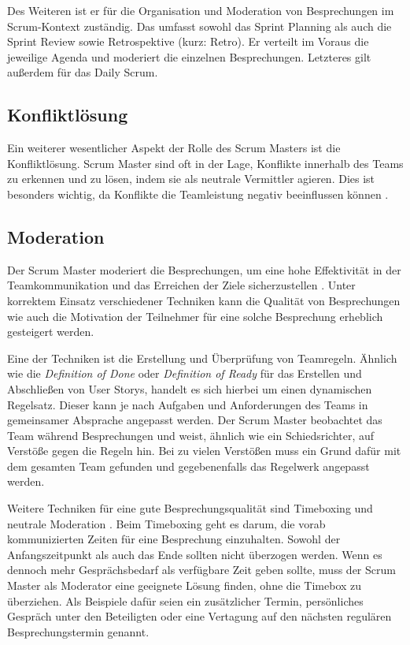 \documentclass[5pt, final]{beamer}
\begin{document}
\begin{frame}[t]
\begin{multicols}{3}
			Des Weiteren ist er für die Organisation und Moderation von Besprechungen im Scrum-Kontext zuständig.
			Das umfasst sowohl das Sprint Planning als auch die Sprint Review sowie Retrospektive (kurz: Retro).
			Er verteilt im Voraus die jeweilige Agenda und moderiert die einzelnen Besprechungen.
			Letzteres gilt außerdem für das Daily Scrum.
			
			\subsection{Konfliktlösung}
			
			Ein weiterer wesentlicher Aspekt der Rolle des Scrum Masters ist die Konfliktlösung. Scrum Master sind oft in der Lage, Konflikte innerhalb des Teams zu erkennen und zu lösen, indem sie als neutrale Vermittler agieren. Dies ist besonders wichtig, da Konflikte die Teamleistung negativ beeinflussen können \cite{Noll17}.
			
			\subsection{Moderation}
			
			Der Scrum Master moderiert die Besprechungen, um eine hohe Effektivität in der Teamkommunikation und das Erreichen der Ziele sicherzustellen \cite{vantighem24}.
			Unter korrektem Einsatz verschiedener Techniken kann die Qualität von Besprechungen wie auch die Motivation der Teilnehmer für eine solche Besprechung erheblich gesteigert werden.
			
			Eine der Techniken ist die Erstellung und Überprüfung von Teamregeln.
			Ähnlich wie die \textit{Definition of Done} oder \textit{Definition of Ready} für das Erstellen und Abschließen von User Storys, handelt es sich hierbei um einen dynamischen Regelsatz.
			Dieser kann je nach Aufgaben und Anforderungen des Teams in gemeinsamer Absprache angepasst werden.
			Der Scrum Master beobachtet das Team während Besprechungen und weist, ähnlich wie ein Schiedsrichter, auf Verstöße gegen die Regeln hin.
			Bei zu vielen Verstößen muss ein Grund dafür mit dem gesamten Team gefunden und gegebenenfalls das Regelwerk angepasst werden.
			
            Weitere Techniken für eine gute Besprechungsqualität sind Timeboxing und neutrale Moderation \cite[S. 23ff.]{malten24}.
            Beim Timeboxing geht es darum, die vorab kommunizierten Zeiten für eine Besprechung einzuhalten.
            Sowohl der Anfangszeitpunkt als auch das Ende sollten nicht überzogen werden.
            Wenn es dennoch mehr Gesprächsbedarf als verfügbare Zeit geben sollte, muss der Scrum Master als Moderator eine geeignete Lösung finden, ohne die Timebox zu überziehen.
            Als Beispiele dafür seien ein zusätzlicher Termin, persönliches Gespräch unter den Beteiligten oder eine Vertagung auf den nächsten regulären Besprechungstermin genannt.
            

\end{multicols}
\end{frame}
\end{document}
